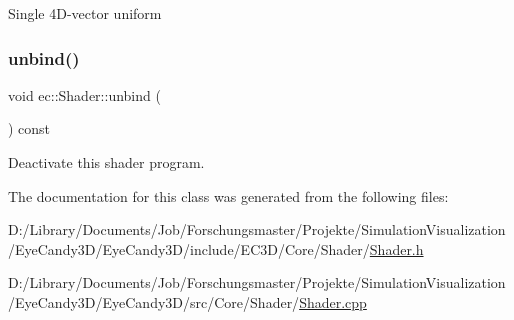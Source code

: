Single 4\+D-\/vector uniform \mbox{\label{classec_1_1_shader_a4d3730787deb6b28d59fc8b6486e5cb3}} 
\subsubsection{\texorpdfstring{unbind()}{unbind()}}
{\footnotesize\ttfamily void ec\+::\+Shader\+::unbind (\begin{DoxyParamCaption}{ }\end{DoxyParamCaption}) const}

Deactivate this shader program. 

The documentation for this class was generated from the following files\+:\begin{DoxyCompactItemize}
\item 
D\+:/\+Library/\+Documents/\+Job/\+Forschungsmaster/\+Projekte/\+Simulation\+Visualization/\+Eye\+Candy3\+D/\+Eye\+Candy3\+D/include/\+E\+C3\+D/\+Core/\+Shader/\mbox{\hyperlink{_shader_8h}{Shader.\+h}}\item 
D\+:/\+Library/\+Documents/\+Job/\+Forschungsmaster/\+Projekte/\+Simulation\+Visualization/\+Eye\+Candy3\+D/\+Eye\+Candy3\+D/src/\+Core/\+Shader/\mbox{\hyperlink{_shader_8cpp}{Shader.\+cpp}}\end{DoxyCompactItemize}
